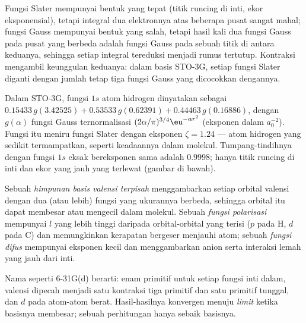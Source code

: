 Fungsi Slater mempunyai bentuk yang tepat (titik runcing di inti, ekor
eksponensial), tetapi integral dua elektronnya atas beberapa pusat sangat
mahal; fungsi Gauss mempunyai bentuk yang salah, tetapi hasil kali dua fungsi
Gauss pada pusat yang berbeda adalah fungsi Gauss pada sebuah titik di antara
keduanya, sehingga setiap integral tereduksi menjadi rumus tertutup.
Kontraksi mengambil keunggulan keduanya: dalam basis STO-3G, setiap fungsi
Slater diganti dengan jumlah tetap tiga fungsi Gauss yang dicocokkan
dengannya.

\begin{example}\label{ex:b3:computational-chemistry:sto3g}
Dalam STO-3G, fungsi $1s$ atom hidrogen dinyatakan sebagai $0.15433\,g(3.42525) + 0.53533\,
g(0.62391) + 0.44463\,g(0.16886)$, dengan $g(\alpha)$ fungsi Gauss ternormalisasi
$(2\alpha/\pi)^{3/4}\eu^{-\alpha r^2}$ (eksponen dalam $a_0^{-2}$). Fungsi itu
meniru fungsi Slater dengan eksponen $\zeta = 1.24$ --- atom hidrogen yang
sedikit termampatkan, seperti keadaannya dalam molekul. Tumpang-tindihnya
dengan fungsi $1s$ eksak bereksponen sama adalah $0.9998$; hanya titik runcing
di inti dan ekor yang jauh yang terlewat (gambar di bawah).
\end{example}

\begin{definition}\label{def:b3:computational-chemistry:split-valence}
Sebuah \emph{himpunan basis valensi
terpisah} menggambarkan setiap orbital valensi dengan dua (atau lebih) fungsi
yang ukurannya berbeda, sehingga orbital itu dapat membesar atau mengecil
dalam molekul. Sebuah \emph{fungsi polarisasi}
mempunyai $l$ yang lebih tinggi daripada orbital-orbital yang terisi ($p$ pada
H, $d$ pada C) dan memungkinkan kerapatan bergeser menjauhi atom; sebuah
\emph{fungsi difus} mempunyai eksponen kecil dan
menggambarkan anion serta interaksi lemah yang jauh dari inti.
\end{definition}

Nama seperti 6-31G(d) berarti: enam primitif untuk setiap fungsi inti
dalam, valensi dipecah menjadi satu kontraksi tiga primitif dan satu primitif
tunggal, dan  $d$ pada atom-atom berat. Hasil-hasilnya
konvergen menuju \emph{limit } ketika basisnya membesar;
sebuah perhitungan hanya sebaik basisnya.


